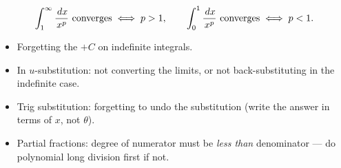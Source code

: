 \begin{keybox}
\[
\int_1^\infty \frac{\dx}{x^p}\ \text{converges} \iff p > 1, \qquad
\int_0^1 \frac{\dx}{x^p}\ \text{converges} \iff p < 1.
\]
\end{keybox}

\begin{pitfallbox}
\begin{itemize}[leftmargin=*,nosep]
  \item Forgetting the $+C$ on indefinite integrals.
  \item In $u$-substitution: not converting the limits, or not back-substituting in the indefinite case.
  \item Trig substitution: forgetting to undo the substitution (write the answer in terms of $x$, not $\theta$).
  \item Partial fractions: degree of numerator must be \emph{less than} denominator --- do polynomial long division first if not.
\end{itemize}
\end{pitfallbox}
